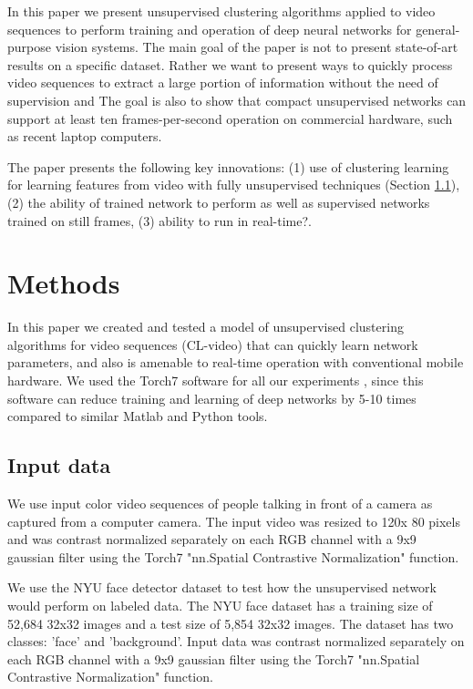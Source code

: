 \documentclass{article} %
\begin{document}
In this paper we present unsupervised clustering algorithms applied to video sequences to perform training and operation of deep neural networks for general-purpose vision systems. 
The main goal of the paper is not to present state-of-art results on a specific dataset. Rather we want to present ways to quickly process video sequences to extract a large portion of information without the need of supervision and 
The goal is also to show that compact unsupervised networks can support at least ten frames-per-second operation on commercial hardware, such as recent laptop computers.

The paper presents the following key innovations: (1) use of clustering learning for learning features from video with fully unsupervised techniques (Section \ref{}), (2) the ability of trained network to perform as well as supervised networks trained on still frames, (3) ability to run in real-time?. 



\section{Methods}
\label{sec-methods}

In this paper we created and tested a model of unsupervised clustering algorithms for video sequences (CL-video) that can quickly learn network parameters, and also is amenable to real-time operation with conventional mobile hardware.
We used the Torch7 software for all our experiments \cite{collobert_torch7_2011}, since this software can reduce training and learning of deep networks by 5-10 times compared to similar Matlab and Python tools.


\subsection{Input data}

We use input color video sequences of people talking in front of a camera as captured from a computer camera. The input video was resized to 120x 80 pixels and was contrast normalized separately on each RGB channel with a 9x9 gaussian filter using the Torch7 "nn.Spatial Contrastive Normalization" function.

We use the NYU face detector dataset to test how the unsupervised network would perform on labeled data. The NYU face dataset has a training size of 52,684 32x32 images and a test size of 5,854 32x32 images. The dataset has two classes: 'face' and 'background'. Input data was contrast normalized separately on each RGB channel with a 9x9 gaussian filter using the Torch7 "nn.Spatial Contrastive Normalization" function.
\end{document}
